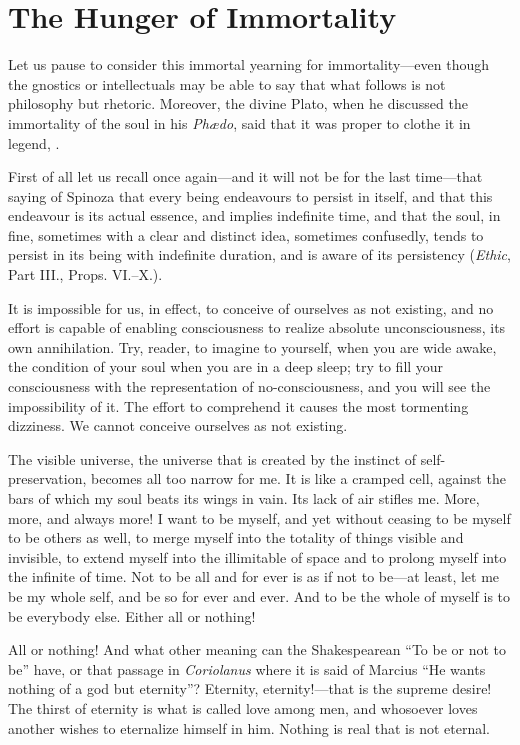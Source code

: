 
\author{Miguel de Unamuno}
\chapter{The Hunger of Immortality}

Let us pause to consider this immortal yearning for
immortality---even though the gnostics or intellectuals may be able to
say that what follows is not philosophy but rhetoric. Moreover, the
divine Plato, when he discussed the immortality of the soul in his
\textit{Ph\ae do}, said that it was proper to clothe it in legend,
.

First of all let us recall once again---and it will not be for the
last time---that saying of Spinoza that every being endeavours to
persist in itself, and that this endeavour is its actual essence, and
implies indefinite time, and that the soul, in fine, sometimes with a
clear and distinct idea, sometimes confusedly, tends to persist in its
being with indefinite duration, and is aware of its persistency
(\textit{Ethic}, Part III., Props. VI.--X.).

It is impossible for us, in effect, to conceive of ourselves as not
existing, and no effort is capable of enabling consciousness to
realize absolute unconsciousness, its own annihilation. Try, reader,
to imagine to yourself, when you are wide awake, the condition of your
soul when you are in a deep sleep; try to fill your consciousness with
the representation of no-consciousness, and you will see the
impossibility of it. The effort to comprehend it causes the most
tormenting dizziness. We cannot conceive ourselves as not existing.

The visible universe, the universe that is created by the instinct of
self-pre\-ser\-va\-tion, becomes all too narrow for me. It is like a
cramped cell, against the bars of which my soul beats its wings in
vain. Its lack of air stifles me. More, more, and always more! I want
to be myself, and yet without ceasing to be myself to be others
 as well, to merge myself into the totality of things visible
and invisible, to extend myself into the illimitable of space and to
prolong myself into the infinite of time. Not to be all and for ever
is as if not to be---at least, let me be my whole self, and be so for
ever and ever. And to be the whole of myself is to be everybody else.
Either all or nothing!

All or nothing! And what other meaning can the Shakespearean ``To be
or not to be'' have, or that passage in \textit{Coriolanus} where it
is said of Marcius ``He wants nothing of a god but eternity''?
Eternity, eternity!---that is the supreme desire! The thirst of
eternity is what is called love among men, and whosoever loves another
wishes to eternalize himself in him. Nothing is real that is not
eternal.

